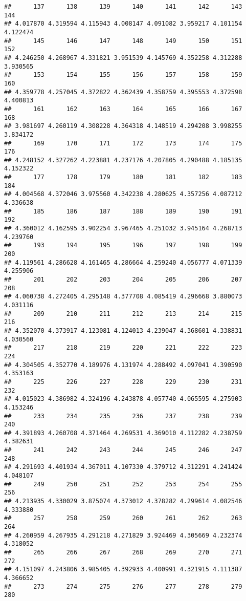 \documentclass[
]{article}
\begin{document}
\begin{verbatim}
##      137      138      139      140      141      142      143      144 
## 4.017870 4.319594 4.115943 4.008147 4.091082 3.959217 4.101154 4.122474 
##      145      146      147      148      149      150      151      152 
## 4.246250 4.268967 4.331821 3.951539 4.145769 4.352258 4.312288 3.930565 
##      153      154      155      156      157      158      159      160 
## 4.359778 4.257045 4.372822 4.362439 4.358759 4.395553 4.372598 4.400813 
##      161      162      163      164      165      166      167      168 
## 3.981697 4.260119 4.308228 4.364318 4.148519 4.294208 3.998255 3.834172 
##      169      170      171      172      173      174      175      176 
## 4.248152 4.327262 4.223881 4.237176 4.207805 4.290488 4.185135 4.152322 
##      177      178      179      180      181      182      183      184 
## 4.004568 4.372046 3.975560 4.342238 4.280625 4.357256 4.087212 4.336638 
##      185      186      187      188      189      190      191      192 
## 4.360012 4.162595 3.902254 3.967465 4.251032 3.945164 4.268713 4.239760 
##      193      194      195      196      197      198      199      200 
## 4.119561 4.286628 4.161465 4.286664 4.259240 4.056777 4.071339 4.255906 
##      201      202      203      204      205      206      207      208 
## 4.060738 4.272405 4.295148 4.377708 4.085419 4.296668 3.880073 4.031116 
##      209      210      211      212      213      214      215      216 
## 4.352070 4.373917 4.123081 4.124013 4.239047 4.368601 4.338831 4.030560 
##      217      218      219      220      221      222      223      224 
## 4.304505 4.352770 4.189976 4.131974 4.288492 4.097041 4.390590 4.353163 
##      225      226      227      228      229      230      231      232 
## 4.015023 4.386982 4.324196 4.243878 4.057740 4.065595 4.275903 4.153246 
##      233      234      235      236      237      238      239      240 
## 4.391893 4.260708 4.371464 4.269531 4.369010 4.112282 4.238759 4.382631 
##      241      242      243      244      245      246      247      248 
## 4.291693 4.401934 4.367011 4.107330 4.379712 4.312291 4.241424 4.048107 
##      249      250      251      252      253      254      255      256 
## 4.213935 4.330029 3.875074 4.373012 4.378282 4.299614 4.082546 4.333880 
##      257      258      259      260      261      262      263      264 
## 4.260959 4.267935 4.291218 4.271829 3.924469 4.305669 4.232374 4.318052 
##      265      266      267      268      269      270      271      272 
## 4.151097 4.243806 3.985405 4.392933 4.400991 4.321915 4.111387 4.366652 
##      273      274      275      276      277      278      279      280 

\end{verbatim}
\end{document}
